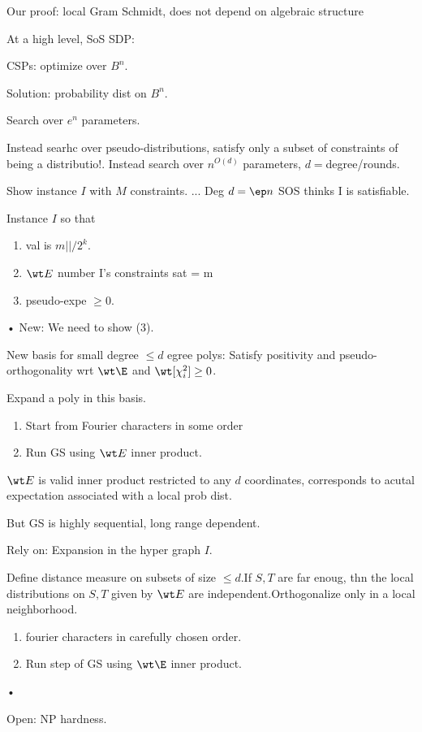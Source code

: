 Our proof: local Gram Schmidt, does not depend on algebraic structure

At a high level, SoS SDP: 

CSPs: optimize over $B^n$. 

Solution: probability dist on $B^n$. 

Search over $e^n$ parameters.

Instead searhc over pseudo-distributions, satisfy only a subset of constraints of being a distributio!. Instead search over $n^{O(d)}$ parameters, $d=$degree/rounds.

Show instance $I$ with $M$ constraints. 
...
Deg $d=\ep n$ SOS thinks I is satisfiable.



Instance $I$ so that 
\begin{enumerate}
\item
val is $m||/2^k$. 
\item
$\wt E$ number I's constraints sat = m
\item 
pseudo-expe $\ge0$. 
\end{enumerate}•
New: We need to show (3).


New basis for small degree $\le d$ egree polys:
Satisfy positivity and pseudo-orthogonality wrt $\wt \E$ and $\wt [\chi_i^2]\ge 0$.

Expand a poly in this basis. %
\begin{enumerate}
\item
Start from Fourier characters in some order
\item
Run GS using $\wt E$ inner product.
\end{enumerate}
$\wt E$ is valid inner product restricted to any $d$ coordinates, corresponds to acutal expectation associated with a local prob dist.

But GS is highly sequential, long range dependent. 

Rely on: Expansion in the hyper graph $I$.


Define distance measure on subsets of size $\le d$.If $S,T$ are far enoug, thn the local distributions on $S,T$ given by $\wt E$ are independent.Orthogonalize only in a local neighborhood.

\begin{enumerate}
\item
fourier characters in carefully chosen order.
\item
Run step of GS using $\wt\E$ inner product.
\end{enumerate}•


Open: NP hardness. 





